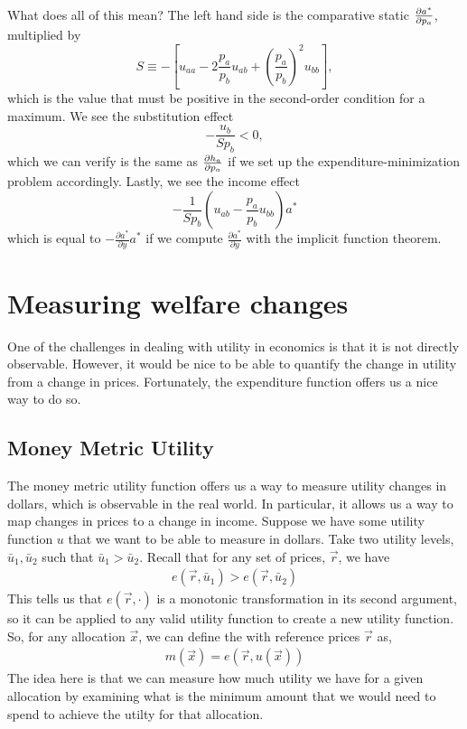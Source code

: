What does all of this mean? The left hand side is the comparative static $\pdv{a^*}{p_a}$, multiplied by
$$
S \equiv -\left[u_{a a}-2 \frac{p_{a}}{p_{b}} u_{a b}+\left(\frac{p_{a}}{p_{b}}\right)^{2} u_{b b}\right],
$$
which is the value that must be positive in the second-order condition for a maximum. We see the substitution effect 
$$
-\frac{u_{b}}{S p_{b}}<0,
$$
which we can verify is the same as $\pdv{h_a}{p_a}$ if we set up the expenditure-minimization problem accordingly. Lastly, we see the income effect 
$$
-\frac{1}{S p_{b}}\left(u_{a b}-\frac{p_{a}}{p_{b}} u_{b b}\right) a^{*}
$$
which is equal to $-\frac{\partial a^{*}}{\partial y} a^{*}$ if we compute $\frac{\partial a^{*}}{\partial y}$ with the implicit function theorem.

\section{Measuring welfare changes}
One of the challenges in dealing with utility in economics is that it is not directly observable. However, it would be nice to be able to quantify the change in utility from a change in prices. Fortunately, the expenditure function offers us a nice way to do so.

\subsection*{Money Metric Utility}
The money metric utility function offers us a way to measure utility changes in dollars, which is observable in the real world. In particular, it allows us a way to map changes in prices to a change in income. Suppose we have some utility function $u$ that we want to be able to measure in dollars. Take two utility levels, $\bar{u}_1, \bar{u}_2$ such that $\bar{u}_1 > \bar{u}_2$. Recall that for any set of prices, $\vec{r}$, we have
\begin{align*}
    e(\vec{r}, \bar{u}_1) > e(\vec{r}, \bar{u}_2)
\end{align*}
This tells us that $e(\vec{r}, \cdot)$ is a monotonic transformation in its second argument, so it can be applied to any valid utility function to create a new utility function. So, for any allocation $\vec{x}$, we can define the  with reference prices $\vec{r}$ as,
\begin{align*}
    m(\vec{x}) = e(\vec{r}, u(\vec{x}))
\end{align*}
The idea here is that we can measure how much utility we have for a given allocation by examining what is the minimum amount that we would need to spend to achieve the utilty for that allocation. 

